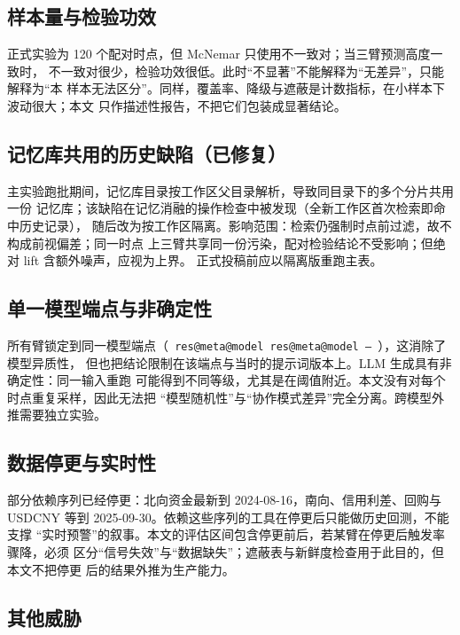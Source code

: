 \documentclass[UTF8,fontset=fandol,11pt,a4paper]{ctexart}
\makeatletter
\newcommand{\RESULT}[2]{%
  \ifcsname res@#1@#2\endcsname
    \csname res@#1@#2\endcsname
  \else
    --%
  \fi}
\makeatother
\begin{document}
\subsection{样本量与检验功效}

正式实验为 120 个配对时点，但 McNemar 只使用不一致对；当三臂预测高度一致时，
不一致对很少，检验功效很低。此时“不显著”不能解释为“无差异”，只能解释为“本
样本无法区分”。同样，覆盖率、降级与遮蔽是计数指标，在小样本下波动很大；本文
只作描述性报告，不把它们包装成显著结论。

\subsection{记忆库共用的历史缺陷（已修复）}

主实验跑批期间，记忆库目录按工作区父目录解析，导致同目录下的多个分片共用一份
记忆库；该缺陷在记忆消融的操作检查中被发现（全新工作区首次检索即命中历史记录），
随后改为按工作区隔离。影响范围：检索仍强制时点前过滤，故不构成前视偏差；同一时点
上三臂共享同一份污染，配对检验结论不受影响；但绝对 lift 含额外噪声，应视为上界。
正式投稿前应以隔离版重跑主表。

\subsection{单一模型端点与非确定性}

所有臂锁定到同一模型端点（\texttt{\RESULT{meta}{model}}），这消除了模型异质性，
但也把结论限制在该端点与当时的提示词版本上。LLM 生成具有非确定性：同一输入重跑
可能得到不同等级，尤其是在阈值附近。本文没有对每个时点重复采样，因此无法把
“模型随机性”与“协作模式差异”完全分离。跨模型外推需要独立实验。

\subsection{数据停更与实时性}

部分依赖序列已经停更：北向资金最新到 2024-08-16，南向、信用利差、回购与
USDCNY 等到 2025-09-30。依赖这些序列的工具在停更后只能做历史回测，不能支撑
“实时预警”的叙事。本文的评估区间包含停更前后，若某臂在停更后触发率骤降，必须
区分“信号失效”与“数据缺失”；遮蔽表与新鲜度检查用于此目的，但本文不把停更
后的结果外推为生产能力。

\subsection{其他威胁}
\end{document}
